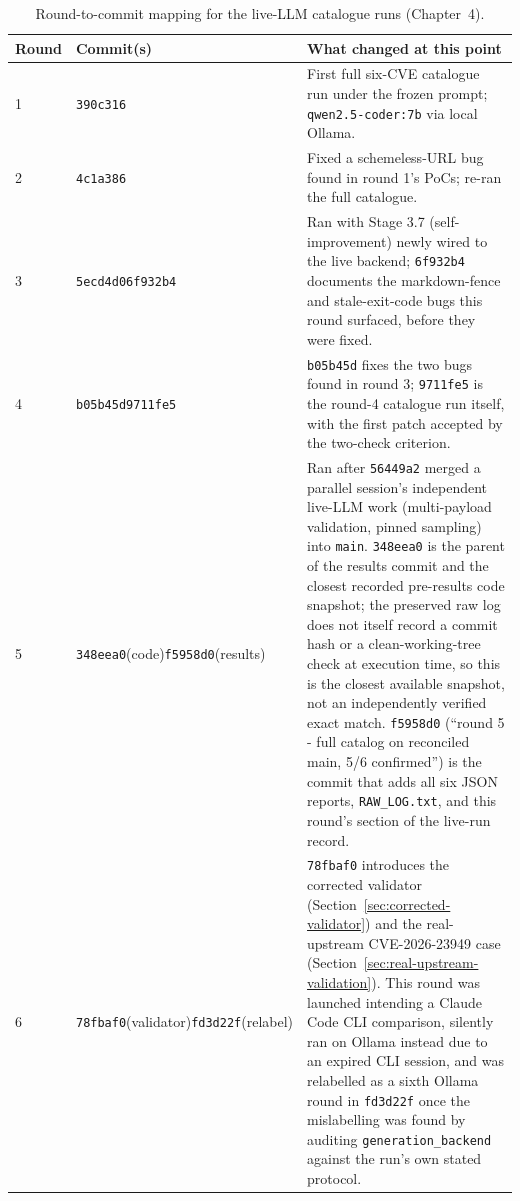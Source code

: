 \documentclass[12pt,a4paper]{report}
\begin{document}
\begin{table}[H]
\centering
\small
\caption{Round-to-commit mapping for the live-LLM catalogue runs (Chapter~4).}
\label{tab:round-commits}
\begin{tabular}{@{}p{1.2cm}p{2.6cm}p{8.7cm}@{}}
\toprule
\textbf{Round} & \textbf{Commit(s)} & \textbf{What changed at this point} \\
\midrule
1 & \texttt{390c316} & First full six-CVE catalogue run under the frozen prompt; \texttt{qwen2.5-coder:7b} via local Ollama. \\
2 & \texttt{4c1a386} & Fixed a schemeless-URL bug found in round 1's PoCs; re-ran the full catalogue. \\
3 & \texttt{5ecd4d0}\newline \texttt{6f932b4} & Ran with Stage 3.7 (self-improvement) newly wired to the live backend; \texttt{6f932b4} documents the markdown-fence and stale-exit-code bugs this round surfaced, before they were fixed. \\
4 & \texttt{b05b45d}\newline \texttt{9711fe5} & \texttt{b05b45d} fixes the two bugs found in round 3; \texttt{9711fe5} is the round-4 catalogue run itself, with the first patch accepted by the two-check criterion. \\
5 & \texttt{348eea0}\newline (code)\newline \texttt{f5958d0}\newline (results) & Ran after \texttt{56449a2} merged a parallel session's independent live-LLM work (multi-payload validation, pinned sampling) into \texttt{main}. \texttt{348eea0} is the parent of the results commit and the closest recorded pre-results code snapshot; the preserved raw log does not itself record a commit hash or a clean-working-tree check at execution time, so this is the closest available snapshot, not an independently verified exact match. \texttt{f5958d0} (``round 5 - full catalog on reconciled main, 5/6 confirmed'') is the commit that adds all six JSON reports, \texttt{RAW\_LOG.txt}, and this round's section of the live-run record. \\
6 & \texttt{78fbaf0}\newline (validator)\newline \texttt{fd3d22f}\newline (relabel) & \texttt{78fbaf0} introduces the corrected validator (Section~\ref{sec:corrected-validator}) and the real-upstream CVE-2026-23949 case (Section~\ref{sec:real-upstream-validation}). This round was launched intending a Claude Code CLI comparison, silently ran on Ollama instead due to an expired CLI session, and was relabelled as a sixth Ollama round in \texttt{fd3d22f} once the mislabelling was found by auditing \texttt{generation\_backend} against the run's own stated protocol. \\

\end{tabular}
\end{table}
\end{document}
